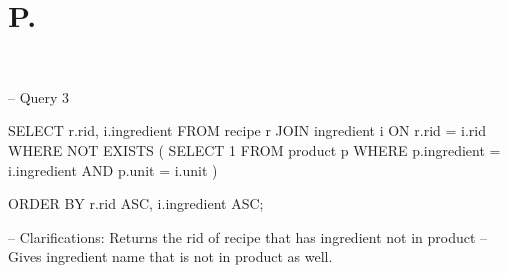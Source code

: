 \documentclass[letterpaper]{article}
\theoremstyle{plain}
\theoremstyle{definition}
\theoremstyle{remark}
\begin{document}
\section*{P.\thesection}
\begin{verbatim}
    
\end{verbatim}
-- Query 3

SELECT r.rid, i.ingredient
FROM recipe r
JOIN ingredient i ON r.rid = i.rid
WHERE NOT EXISTS (
    SELECT 1
    FROM product p
    WHERE p.ingredient = i.ingredient
        AND p.unit = i.unit
)

ORDER BY r.rid ASC, i.ingredient ASC;

-- Clarifications: Returns the rid of recipe that has ingredient not in product
--                 Gives ingredient name that is not in product as well. 
\end{document}
